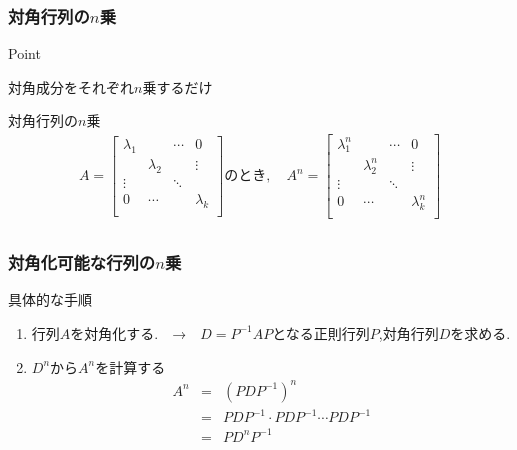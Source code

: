\documentclass[a4paper]{jsarticle}
\begin{document}
\subsubsection{対角行列の$n$乗}
\begin{itembox}[l]{Point}
    \begin{center}
        対角成分をそれぞれ$n$乗するだけ
    \end{center}
\end{itembox}
\begin{itembox}[l]{対角行列の$n$乗}
    \begin{eqnarray*}
        A=
        \begin{bmatrix}
            \lambda_1 &           & \cdots & 0         \\
                      & \lambda_2 &        & \vdots    \\
            \vdots    &           & \ddots &           \\
            0         & \cdots    &        & \lambda_k \\
        \end{bmatrix}
        のとき,\quad A^n=
        \begin{bmatrix}
            \lambda_1^n &             & \cdots & 0           \\
                        & \lambda_2^n &        & \vdots      \\
            \vdots      &             & \ddots &             \\
            0           & \cdots      &        & \lambda_k^n \\
        \end{bmatrix}\\
    \end{eqnarray*}
\end{itembox}
\subsubsection{対角化可能な行列の$n$乗}
\begin{itembox}[l]{具体的な手順}
    \begin{enumerate}
        \item 行列$A$を対角化する.　→　$D=P^{-1}AP$となる正則行列$P$,対角行列$D$を求める.
        \item $D^n$から$A^n$を計算する
              \begin{eqnarray*}
                  A^n
                  &=&\left(PDP^{-1}\right)^n\\
                  &=&PDP^{-1}\cdot PDP^{-1}\cdots PDP^{-1}\\
                  &=&PD^nP^{-1}\\
              \end{eqnarray*}
    \end{enumerate}
\end{itembox}
\newpage
\end{document}
